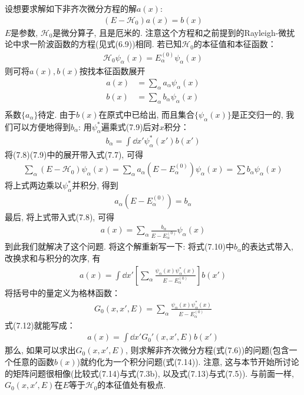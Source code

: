 设想要求解如下非齐次微分方程的解$a(x)$:
\begin{align}
(E - \mathscr{H}_0)a(x) = b(x)
\end{align}
$E$是参数, $\mathscr{H}_0$是微分算子, 且是厄米的. 注意这个方程和之前提到的Rayleigh-\sch 微扰论中求一阶波函数的方程(见式(6.9))相同. 若已知$\mathscr{H}_0$的本征值和本征函数：
\begin{align}
\mathscr{H}_0\psi_\alpha(x) = E_\alpha^{(0)} \psi_\alpha(x)
\end{align}
则可将$a(x),b(x)$按找本征函数展开
\begin{align}
a(x) & = \sum_\alpha a_\alpha \psi_\alpha(x)\\
b(x) & = \sum_\alpha b_\alpha \psi_\alpha(x)\\
\end{align}
系数$\{ a_\alpha \}$待定. 由于$b(x)$在原式中已给出, 而且集合$\{ \psi_\alpha(x)\}$是正交归一的, 我们可以方便地得到$b_\alpha$: 用$\psi_\alpha^*$遍乘式(7.9)后对$x$积分：
\begin{align}
b_\alpha = \int\dd x'\psi_\alpha^*(x')b(x')
\end{align}
将(7.8)(7.9)中的展开带入式(7.7), 可得
\begin{align*}
\sum_\alpha (E - \mathscr{H}_0)\psi_\alpha(x) = \sum_\alpha a_\alpha (E - E_\alpha^{(0)}) \psi_\alpha(x) = \sum b_\alpha\psi_\alpha(x)
\end{align*}
将上式两边乘以$\psi_\alpha^*$并积分, 得到
\begin{align*}
a_\alpha (E - E_\alpha^{(0)}) = b_{\alpha}
\end{align*}
最后, 将上式带入式(7.8), 可得
\begin{align}
a(x) = \sum_\alpha \frac{b_{\alpha}}{E - E_\alpha^{(0)}} \psi_\alpha(x)
\end{align}
到此我们就解决了这个问题. 将这个解重新写一下: 将式(7.10)中$b_\alpha$的表达式带入, 改换求和与积分的次序, 有
\begin{align}
a(x) = \int\dd x'\left[ \sum_\alpha \frac{\psi_\alpha(x)\psi_\alpha^*(x)}{E - E_\alpha^{(0)}} \right] b(x')
\end{align}
将括号中的量定义为格林函数：
\begin{align}
G_0 (x,x',E) = \sum_\alpha \frac{\psi_\alpha(x)\psi_\alpha^*(x)}{E - E_\alpha^{(0)}}
\end{align}
式(7.12)就能写成：
\begin{align}
a(x) = \int\dd x' G_0'(x,x',E)b(x')
\end{align}
那么, 如果可以求出$G_0(x,x',E)$, 则求解非齐次微分方程(式(7.6))的问题(包含一个任意的函数$b(x)$)就约化为一个积分问题(式(7.14)). 注意, 这与本节开始所讨论的矩阵问题很相像(比较式(7.14)与式(7.3b), 以及式(7.13)与式(7.5)). 与前面一样, $G_0(x,x',E)$在$E$等于$\mathscr{H}_0$的本征值处有极点.

